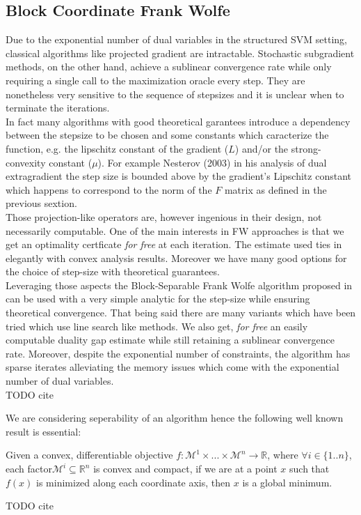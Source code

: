 \subsection{Block Coordinate Frank Wolfe}
Due to the exponential number of dual variables in the structured SVM setting,
classical algorithms like projected gradient are intractable. Stochastic
subgradient methods, on the other hand, achieve a sublinear convergence rate
while only requiring a single call to the maximization oracle every step. They
are nonetheless very sensitive to the sequence of stepsizes and it is unclear
when to terminate the iterations. \\

In fact many algorithms with good theoretical garantees introduce a dependency
between the stepsize to be chosen and some constants which caracterize the
function, e.g. the lipschitz constant of the gradient ($L$) and/or the
strong-convexity constant ($\mu$). For example Nesterov (2003) in his analysis
of dual extragradient the step size is bounded above by the gradient's Lipschitz
constant which happens to correspond to the norm of the $F$ matrix as defined in
the previous sextion.\\

Those projection-like operators are, however ingenious in their design, not
necessarily computable. One of the main interests in FW approaches is that we
get an optimality certficate \textit{for free} at each iteration. The estimate
used ties in elegantly with convex analysis results. Moreover we have many good
options for the choice of step-size with theoretical guarantees.\\

Leveraging those aspects the Block-Separable Frank Wolfe algorithm proposed in
\cite{lacoste-julienBlockCoordinateFrankWolfeOptimization2013} can be used with
a very simple analytic for the step-size while ensuring theoretical convergence.
That being said there are many variants which have been tried which use line
search like methods. We also get, \textit{for free} an easily computable duality
gap estimate while still retaining a sublinear convergence rate. Moreover,
despite the exponential number of constraints, the algorithm has sparse iterates
alleviating the memory issues which come with the exponential number of dual
variables. \\
TODO cite 

\clearpage
We are considering seperability of an algorithm hence the following well known
result is essential:
\begin{theorem} Given a convex, differentiable objective
$f:\mathcal{M}^{1}\times...\times\mathcal{M}^{n}\to\mathbb{R}$, where $\forall
i\in\{1..n\}$, each factor\quad $\mathcal{M}^{i}\subseteq\mathbb{R}^{n}$ is
convex and compact, if we are at a point $x$ such that $f(x)$ is minimized along
each coordinate axis, then $x$ is a global minimum.
\end{theorem}
TODO cite

